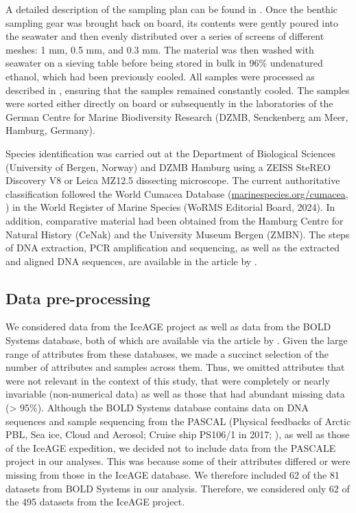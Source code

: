 A detailed description of the sampling plan can be found in \cite{brix2014iceage}. Once the benthic sampling gear was brought back on board, its contents were gently poured into the seawater and then evenly distributed over a series of screens of different meshes: 1 mm, 0.5 mm, and 0.3 mm. The material was then washed with seawater on a sieving table before being stored in bulk in 96\% undenatured ethanol, which had been previously cooled. All samples were processed as described in \cite{riehl2014field}, ensuring that the samples remained constantly cooled. The samples were sorted either directly on board or subsequently in the laboratories of the German Centre for Marine Biodiversity Research (DZMB, Senckenberg am Meer, Hamburg, Germany).

Species identification was carried out at the Department of Biological Sciences (University of Bergen, Norway) and DZMB Hamburg using a ZEISS SteREO Discovery V8 or Leica MZ12.5 dissecting microscope. The current authoritative classification followed the World Cumacea Database (\href{http://www.marinespecies.org/cumacea/}{marinespecies.org/cumacea}, \citep{watling2019world}) in the World Register of Marine Species (WoRMS Editorial Board, 2024). In addition, comparative material had been obtained from the Hamburg Centre for Natural History (CeNak) and the University Museum Bergen (ZMBN). The steps of DNA extraction, PCR amplification and sequencing, as well as the extracted and aligned DNA sequences, are available in the article by \cite{uhlir2021adding}.

\subsection{Data pre-processing}
We considered data from the IceAGE project as well as data from the BOLD Systems database, both of which are available via the article by \cite{uhlir2021adding}. Given the large range of attributes from these databases, we made a succinct selection of the number of attributes and samples across them. Thus, we omitted attributes that were not relevant in the context of this study, that were completely or nearly invariable (non-numerical data) as well as those that had abundant missing data (> 95\%). Although the BOLD Systems database contains data on DNA sequences and sample sequencing from the PASCAL (Physical feedbacks of Arctic PBL, Sea ice, Cloud and Aerosol; Cruise ship PS106/1 in 2017; \citep{macke2017physical}), as well as those of the IceAGE expedition, we decided not to include data from the PASCALE project in our analyses. This was because some of their attributes differed or were missing from those in the IceAGE database. We therefore included 62 of the 81 datasets from BOLD Systems in our analysis. Therefore, we considered only 62 of the 495 datasets from the IceAGE project.

